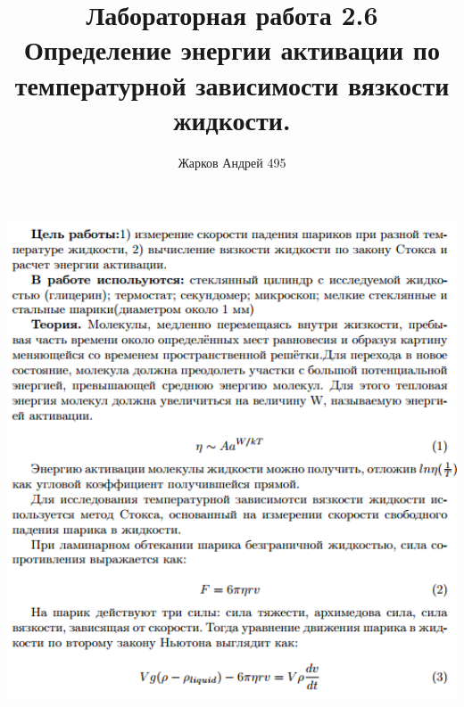\documentclass[12pt]{article}
\begin{document}
    \author {Жарков Андрей 495}
    \title {Лабораторная работа 2.6 \\  Определение энергии активации по температурной зависимости вязкости жидкости.}
    \maketitle{}
    
    \begin{center}
    	\includegraphics[width=14cm]{theory1.png}

\end{center}
\end{document}
